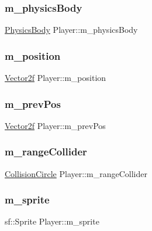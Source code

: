 \subsubsection{\texorpdfstring{m\_physicsBody}{m\_physicsBody}}
{\footnotesize\ttfamily \mbox{\hyperlink{class_physics_body}{Physics\+Body}} Player\+::m\+\_\+physics\+Body}

\mbox{\label{class_player_a84084a5e97891280d56c093264e62720}} 
\subsubsection{\texorpdfstring{m\_position}{m\_position}}
{\footnotesize\ttfamily \mbox{\hyperlink{class_vector2f}{Vector2f}} Player\+::m\+\_\+position}

\mbox{\label{class_player_a3d5f4aa30da7571cc93beef07c364539}} 
\subsubsection{\texorpdfstring{m\_prevPos}{m\_prevPos}}
{\footnotesize\ttfamily \mbox{\hyperlink{class_vector2f}{Vector2f}} Player\+::m\+\_\+prev\+Pos}

\mbox{\label{class_player_ae12b339db716d6dcf1f5e4400c28c532}} 
\subsubsection{\texorpdfstring{m\_rangeCollider}{m\_rangeCollider}}
{\footnotesize\ttfamily \mbox{\hyperlink{class_collision_circle}{Collision\+Circle}} Player\+::m\+\_\+range\+Collider}

\mbox{\label{class_player_acea3e1bbd92be7a0fbf26764ec919b24}} 
\subsubsection{\texorpdfstring{m\_sprite}{m\_sprite}}
{\footnotesize\ttfamily sf\+::\+Sprite Player\+::m\+\_\+sprite}

